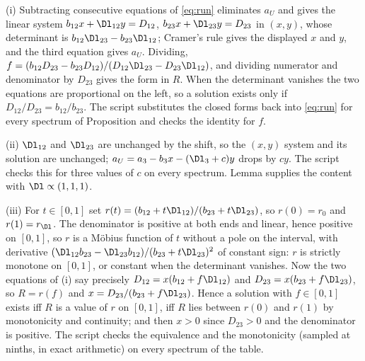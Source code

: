 (i) Subtracting consecutive equations of \eqref{eq:run} eliminates $a_{U}$ and gives the linear system $b_{12}x + \Dl_{12}y = D_{12}$, $b_{23}x + \Dl_{23}y = D_{23}$ in $(x, y)$, whose determinant is $b_{12}\Dl_{23} - b_{23}\Dl_{12}$; Cramer's rule gives the displayed $x$ and $y$, and the third equation gives $a_{U}$. Dividing, $f = (b_{12}D_{23} - b_{23}D_{12})/(D_{12}\Dl_{23} - D_{23}\Dl_{12})$, and dividing numerator and denominator by $D_{23}$ gives the form in $R$. When the determinant vanishes the two equations are proportional on the left, so a solution exists only if $D_{12}/D_{23} = b_{12}/b_{23}$. The script substitutes the closed forms back into \eqref{eq:run} for every spectrum of Proposition  and checks the identity for $f$.

(ii) $\Dl_{12}$ and $\Dl_{23}$ are unchanged by the shift, so the $(x, y)$ system and its solution are unchanged; $a_{U} = a_{3} - b_{3}x - (\Dl_{3} + c)y$ drops by $cy$. The script checks this for three values of $c$ on every spectrum. Lemma  supplies the content with $\Dl \propto (1,1,1)$.

(iii) For $t \in [0, 1]$ set $r(t) = (b_{12} + t\Dl_{12})/(b_{23} + t\Dl_{23})$, so $r(0) = r_{0}$ and $r(1) = r_{\Dl}$. The denominator is positive at both ends and linear, hence positive on $[0, 1]$, so $r$ is a M\"obius function of $t$ without a pole on the interval, with derivative $(\Dl_{12}b_{23} - \Dl_{23}b_{12})/(b_{23} + t\Dl_{23})^{2}$ of constant sign: $r$ is strictly monotone on $[0, 1]$, or constant when the determinant vanishes. Now the two equations of (i) say precisely $D_{12} = x(b_{12} + f\Dl_{12})$ and $D_{23} = x(b_{23} + f\Dl_{23})$, so $R = r(f)$ and $x = D_{23}/(b_{23} + f\Dl_{23})$. Hence a solution with $f \in [0, 1]$ exists iff $R$ is a value of $r$ on $[0, 1]$, iff $R$ lies between $r(0)$ and $r(1)$ by monotonicity and continuity; and then $x > 0$ since $D_{23} > 0$ and the denominator is positive. The script checks the equivalence and the monotonicity (sampled at ninths, in exact arithmetic) on every spectrum of the table.

